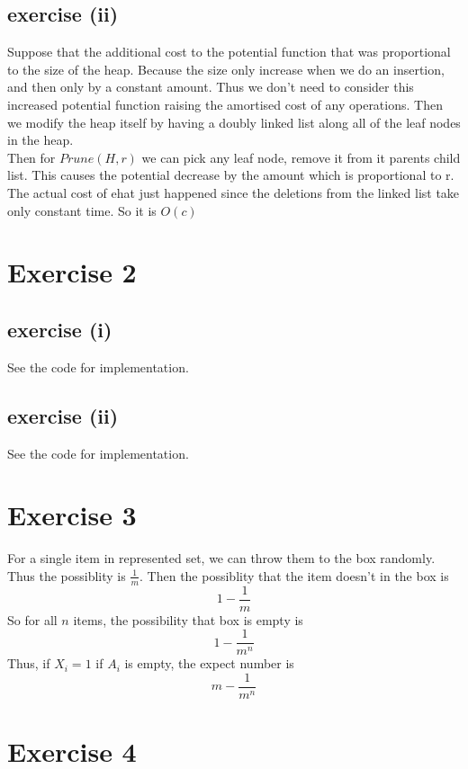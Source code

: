 \documentclass[12pt,oneside,a4paper]{article}
\begin{document}
\subsection{exercise (ii)}
Suppose that the additional cost to the potential function that was proportional to the size of the heap. Because the size only increase
when we do an insertion, and then only by a constant amount. Thus we don't need to consider this increased potential function raising
the amortised cost of any operations. Then we modify the heap itself  by having a doubly linked list along all of the leaf nodes in the heap.\\
Then for $Prune(H,r)$ we can pick any leaf node, remove it from it parents child list. This causes the potential decrease by the amount which 
is proportional to r. The actual cost of ehat just happened since the deletions from the linked list take only constant time.
So it is $O(c)$
\section{Exercise 2}
\subsection{exercise (i)}
See the code for implementation.
\subsection{exercise (ii)}
See the code for implementation.
\section{Exercise 3}

For a single item in represented set, we can throw them to the box randomly. Thus the possiblity is $\frac{1}{m}$. Then the possiblity that 
the item doesn't in the box is 
$$
1-\frac{1}{m}
$$
So for all $n$ items, the possibility that box is empty is 
$$
1-\frac{1}{m^n}
$$
Thus, if $X_i=1$ if $A_i$ is empty, the expect number is 
$$
m-\frac{1}{m^n}
$$ 
\section{Exercise 4}
\end{document}
